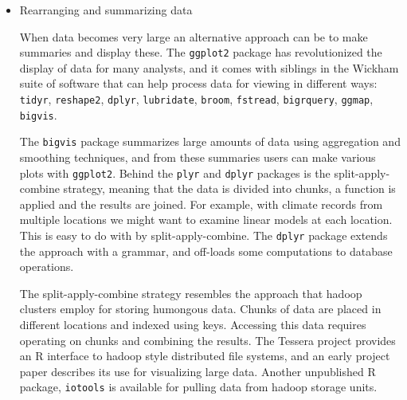 \documentclass{article}
\begin{document}
\begin{itemize}
\item Rearranging and summarizing data 

When data becomes very large an alternative approach can be to make summaries and display these. The {\tt ggplot2} package has revolutionized the display of data for many analysts, and it comes with siblings in the Wickham suite of software that can help process data for viewing in different ways: {\tt tidyr}, {\tt reshape2}, {\tt dplyr}, {\tt lubridate}, {\tt broom}, {\tt fstread}, {\tt bigrquery}, {\tt ggmap}, {\tt bigvis}.

The {\tt bigvis} package \citep{bigvis} summarizes large amounts of data using aggregation and smoothing techniques, and from these summaries users can make various plots with {\tt ggplot2}. Behind the {\tt plyr} \citep{plyr} and {\tt dplyr} \citep{dplyr} packages is the split-apply-combine strategy, meaning that the data is divided into chunks, a function is applied and the results are joined. For example, with climate records from multiple locations we might want to examine linear models at each location. This is easy to do with by split-apply-combine. The {\tt dplyr} package extends the approach with a grammar, and off-loads some computations to database operations.

The split-apply-combine strategy resembles the approach that hadoop \citep{hadoop} clusters employ for storing humongous data. Chunks of data are placed in different locations and indexed using keys. Accessing this data requires operating on chunks and combining the results. The Tessera project \citep{tessera} provides an R interface to hadoop style distributed file systems, and an early project paper \citep{guha} describes its use for visualizing large data. Another unpublished R package, {\tt iotools} \citep{urbanek} is available for pulling data from hadoop storage units.



\end{itemize}
\end{document}

